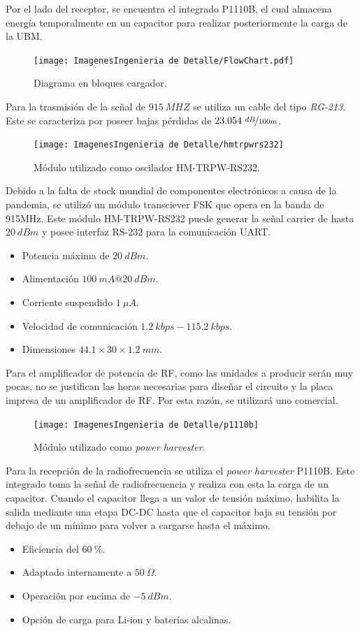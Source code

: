 Por el lado del receptor, se encuentra el integrado P1110B, el cual almacena energía temporalmente en un capacitor para realizar posteriormente la carga de la UBM.

\begin{figure}[H]
	\centering	
	\texttt{[image: ImagenesIngenieria de Detalle/FlowChart.pdf]}
	\caption{Diagrama en bloques cargador.}
	\label{fig:diagrama_hardware_antenas}
\end{figure}

Para la trasmisión de la señal de $915 \ MHZ$ se utiliza un cable del tipo \textit{RG-213}. Este se caracteriza por poseer bajas pérdidas de $23.054 \ \nicefrac{dB}{100m}$.

\begin{figure}[H]
	\centering	
	\texttt{[image: ImagenesIngenieria de Detalle/hmtrpwrs232]}
	\caption{Módulo utilizado como oscilador HM-TRPW-RS232.}
	\label{fig:oscilador}
\end{figure}

Debido a la falta de stock mundial de componentes electrónicos a causa de la pandemia, se utilizó un módulo transciever FSK que opera en la banda de 915MHz. Este módulo HM-TRPW-RS232 puede generar la señal carrier de hasta $20 \ dBm$ y posee interfaz RS-232 para la comunicación UART.

\begin{itemize}
	\item Potencia máxima de $20 \ dBm$.
	\item Alimentación $100 \ mA@20 \ dBm$.
	\item Corriente suspendido $1 \ \mu A$.
	\item Velocidad de comunicación $1.2 \ kbps - 115.2 \ kbps$.
	\item Dimensiones $44.1 \times 30  \times 1.2 \ mm$.
\end{itemize}

Para el amplificador de potencia de RF, como las unidades a producir serán muy pocas, no se justifican las horas necesarias para diseñar el circuito y la placa impresa de un amplificador de RF. Por esta razón, se utilizará uno comercial. 

\begin{figure}[H]
	\centering	
	\texttt{[image: ImagenesIngenieria de Detalle/p1110b]}
	\caption{Módulo utilizado como \textit{power harvester}.}
	\label{fig:p1110b}
\end{figure}

Para la recepción de la radiofrecuencia se utiliza el \textit{power harvester} P1110B. Este integrado toma la señal de radiofrecuencia y realiza con esta la carga de un capacitor. Cuando el capacitor llega a un valor de tensión máximo, habilita la salida mediante una etapa DC-DC hasta que el capacitor baja su tensión por debajo de un mínimo para volver a cargarse hasta el máximo.
\begin{itemize}
	\item Eficiencia del $60 \ \%$.
	\item Adaptado internamente a $50 \ \Omega$.
	\item Operación por encima de $-5 \ dBm$.
	\item Opción de carga para Li-ion y baterías alcalinas.
\end{itemize}


